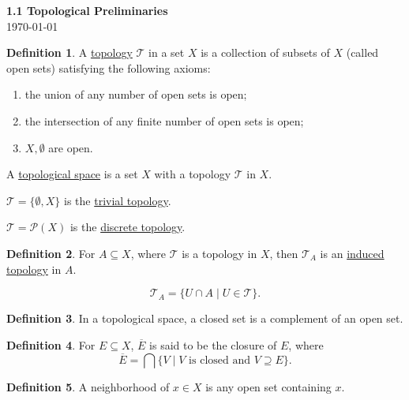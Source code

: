 \documentclass[11pt]{article}
\theoremstyle{definition}
\newtheorem{definition}{Definition}[section]
\theoremstyle{remark}
\begin{document}
\begin{center}
{\Large\textbf{1.1 Topological Preliminaries}}\\
\vspace{0.3cm}
{\normalsize\today}
\end{center}

\vspace{0.5cm}

\begin{definition}\label{def:topology}
A \underline{topology} $\mathcal{T}$ in a set $X$ is a collection of subsets of $X$ (called open sets) satisfying the following axioms:
\begin{enumerate}[(1)]
\item the union of any number of open sets is open;
\item the intersection of any finite number of open sets is open;
\item $X, \emptyset$ are open.
\end{enumerate}
A \underline{topological space} is a set $X$ with a topology $\mathcal{T}$ in $X$.

$\mathcal{T} = \{ \emptyset, X \}$ is the \underline{trivial topology}.

$\mathcal{T} = \mathcal{P}(X)$ is the \underline{discrete topology}.
\end{definition}

\begin{definition}\label{def:induced_topology}
For $A \subseteq X$, where $\mathcal{T}$ is a topology in $X$, then $\mathcal{T}_A$ is an \underline{induced topology} in $A$.
\end{definition}

\[
\mathcal{T}_A=\{U\cap A\mid U\in\mathcal{T}\}.
\]

\begin{definition}\label{def:closed_set}
In a topological space, a closed set is a complement of an open set.
\end{definition}

\begin{definition}\label{def:closure}
For $E\subseteq X$, $\overline E$ is said to be the closure of $E$, where
\[
\overline E=\bigcap\{V\mid V\text{ is closed and }V\supseteq E\}.
\]
\end{definition}

\begin{definition}\label{def:neighborhood}
A neighborhood of $x\in X$ is any open set containing $x$.
\end{definition}
\end{document}
